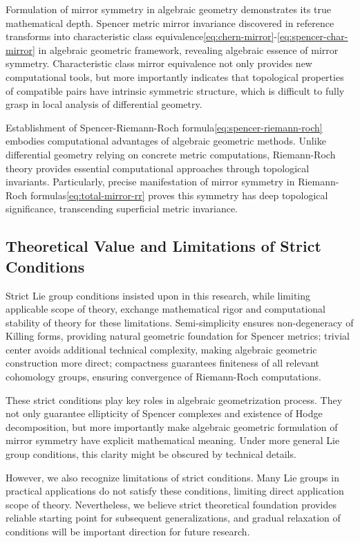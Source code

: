 \documentclass[a4paper,12pt]{extarticle}
\theoremstyle{definition}
\begin{document}
Formulation of mirror symmetry in algebraic geometry demonstrates its true mathematical depth. Spencer metric mirror invariance discovered in reference\cite{zheng2025mirror} transforms into characteristic class equivalence\eqref{eq:chern-mirror}-\eqref{eq:spencer-char-mirror} in algebraic geometric framework, revealing algebraic essence of mirror symmetry. Characteristic class mirror equivalence not only provides new computational tools, but more importantly indicates that topological properties of compatible pairs have intrinsic symmetric structure, which is difficult to fully grasp in local analysis of differential geometry.

Establishment of Spencer-Riemann-Roch formula\eqref{eq:spencer-riemann-roch} embodies computational advantages of algebraic geometric methods. Unlike differential geometry relying on concrete metric computations, Riemann-Roch theory provides essential computational approaches through topological invariants. Particularly, precise manifestation of mirror symmetry in Riemann-Roch formulas\eqref{eq:total-mirror-rr} proves this symmetry has deep topological significance, transcending superficial metric invariance.

\subsection{Theoretical Value and Limitations of Strict Conditions}

Strict Lie group conditions insisted upon in this research, while limiting applicable scope of theory, exchange mathematical rigor and computational stability of theory for these limitations. Semi-simplicity ensures non-degeneracy of Killing forms, providing natural geometric foundation for Spencer metrics; trivial center avoids additional technical complexity, making algebraic geometric construction more direct; compactness guarantees finiteness of all relevant cohomology groups, ensuring convergence of Riemann-Roch computations.

These strict conditions play key roles in algebraic geometrization process. They not only guarantee ellipticity of Spencer complexes and existence of Hodge decomposition, but more importantly make algebraic geometric formulation of mirror symmetry have explicit mathematical meaning. Under more general Lie group conditions, this clarity might be obscured by technical details.

However, we also recognize limitations of strict conditions. Many Lie groups in practical applications do not satisfy these conditions, limiting direct application scope of theory. Nevertheless, we believe strict theoretical foundation provides reliable starting point for subsequent generalizations, and gradual relaxation of conditions will be important direction for future research.
\end{document}
